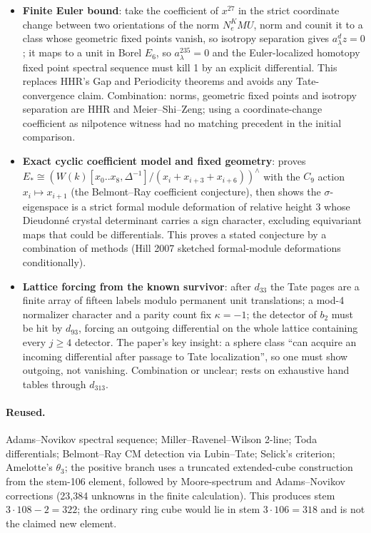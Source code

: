 \documentclass[11pt]{article}
\begin{document}
\begin{itemize}
\item \textbf{Finite Euler bound}: take the coefficient of $x^{27}$ in the strict coordinate change between two orientations of the norm $N_e^KMU$, norm and counit it to a class whose geometric fixed points vanish, so isotropy separation gives $a_\lambda^dz=0$; it maps to a unit in Borel $E_6$, so $a_\lambda^{235}=0$ and the Euler-localized homotopy fixed point spectral sequence must kill 1 by an explicit differential. This replaces HHR's Gap and Periodicity theorems and avoids any Tate-convergence claim. Combination: norms, geometric fixed points and isotropy separation are HHR and Meier--Shi--Zeng; using a coordinate-change coefficient as nilpotence witness had no matching precedent in the initial comparison.
\item \textbf{Exact cyclic coefficient model and fixed geometry}: proves $E_*\cong(W(k)[x_0..x_8,\Delta^{-1}]/(x_i+x_{i+3}+x_{i+6}))^\wedge$ with the $C_9$ action $x_i\mapsto x_{i+1}$ (the Belmont--Ray coefficient conjecture), then shows the $\sigma$-eigenspace is a strict formal module deformation of relative height 3 whose Dieudonné crystal determinant carries a sign character, excluding equivariant maps that could be differentials. This proves a stated conjecture by a combination of methods (Hill 2007 sketched formal-module deformations conditionally).
\item \textbf{Lattice forcing from the known survivor}: after $d_{33}$ the Tate pages are a finite array of fifteen labels modulo permanent unit translations; a mod-4 normalizer character and a parity count fix $\kappa=-1$; the detector of $b_2$ must be hit by $d_{93}$, forcing an outgoing differential on the whole lattice containing every $j \ge 4$ detector. The paper's key insight: a sphere class ``can acquire an incoming differential after passage to Tate localization'', so one must show outgoing, not vanishing. Combination or unclear; rests on exhaustive hand tables through $d_{313}$.
\end{itemize}

\paragraph{Reused.}

Adams--Novikov spectral sequence; Miller--Ravenel--Wilson 2-line; Toda differentials; Belmont--Ray CM detection via Lubin--Tate; Selick's criterion; Amelotte's $\theta_{3}$; the positive branch uses a truncated extended-cube construction from the stem-106 element, followed by Moore-spectrum and Adams--Novikov corrections (23,384 unknowns in the finite calculation). This produces stem $3\cdot108-2=322$; the ordinary ring cube would lie in stem $3\cdot106=318$ and is not the claimed new element.
\end{document}
